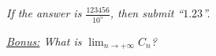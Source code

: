\documentclass[a4paper, top=10mm]{article}
\begin{document}
	\vspace{1cm}
	
	\textit{If the answer is $\frac{123456}{10^5}$, then submit “$1.23$”.}
	
	\vspace{5\baselineskip}
	
	\textit{\underline{Bonus:} What is $\lim_{n \to +\infty} C_n$?}
	
	
\end{document}
